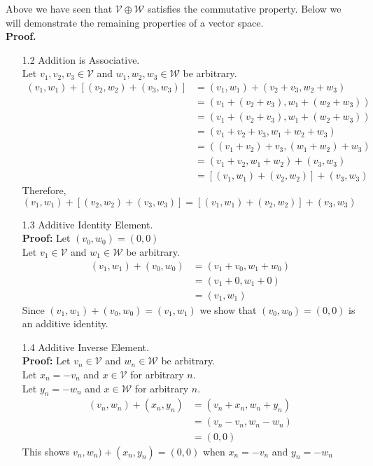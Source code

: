\documentclass[12pt]{amsart}
\newcommand{\1}{\mathbbm{1}}
\numberwithin{equation}{section}
\numberwithin{Theorem}{section}
\theoremstyle{plain} %
\theoremstyle{definition}
\theoremstyle{remark}
\begin{document}
\begin{enumerate}[1.]
Above we have seen that $\mathcal{V}\oplus\mathcal{W}$ satisfies the commutative property. Below we will demonstrate the remaining properties of a vector space. \\
\textbf{Proof.} \\

\begin{itemize}
	\item[1.2] Addition is Associative. \\
	Let $v_1,v_2,v_3 \in \mathcal{V}$ and $w_1,w_2,w_3 \in \mathcal{W}$ be arbitrary.
	\begin{align*}
		(v_1,w_1)+[(v_2,w_2)+(v_3,w_3)] 
		&=   (v_1,w_1)+(v_2+v_3, w_2+w_3) \\
		&=   (v_1+ (v_2+v_3), w_1+ (w_2+w_3)) \\
		&=   (v_1+ (v_2+v_3),  w_1+ (w_2+w_3)) \\
		&=   (v_1+ v_2+v_3,  w_1+ w_2+w_3) \\
		&=   ((v_1+ v_2)+v_3,  (w_1+ w_2)+w_3) \\
		&=   (v_1+ v_2 , w_1+ w_2) + (v_3, w_3) \\
		&=   [(v_1,w_1)+(v_2,w_2)]+(v_3,w_3)  
	\end{align*}
	Therefore, $(v_1,w_1)+[(v_2,w_2)+(v_3,w_3)]  =  [(v_1,w_1)+(v_2,w_2)]+(v_3,w_3)$ \\
	
	\item[1.3]  Additive Identity Element. \\
	\textbf{Proof:}
	Let $(v_0,w_0) =(0,0)$ \\
	Let $v_1 \in \mathcal{V}$ and $w_1 \in \mathcal{W}$ be arbitrary.
	\begin{align*}
				(v_1,w_1)+(v_0,w_0)
		&=   (v_1+v_0, w_1+w_0) \\
		&=   (v_1+0, w_1+0) \\
		&=   (v_1, w_1)
	\end{align*}
	Since $(v_1,w_1)+(v_0,w_0) = (v_1, w_1)$ we show that $(v_0,w_0) =(0,0)$ is an additive identity. \\
	
	\item[1.4]  Additive Inverse Element. \\
	\textbf{Proof:}
	Let $v_n \in \mathcal{V}$ and $w_n \in \mathcal{W}$ be arbitrary. \\
	Let $x_n = -v_n$ and $x\in \mathcal{V}$ for arbitrary $n$. \\
	Let $y_n = -w_n$ and $x\in \mathcal{W}$ for arbitrary $n$. 
	\begin{align*}
			(v_n,w_n)+(x_n,y_n)
		&= (v_n+x_n, w_n+y_n) \\
		&= (v_n-v_n, w_n-w_n) \\
		&= (0,0)
	\end{align*}
	This shows $v_n,w_n)+(x_n,y_n) = (0,0)$ when $x_n = -v_n$ and $y_n = -w_n$ \\
	

\end{itemize}
\end{enumerate}
\end{document}
